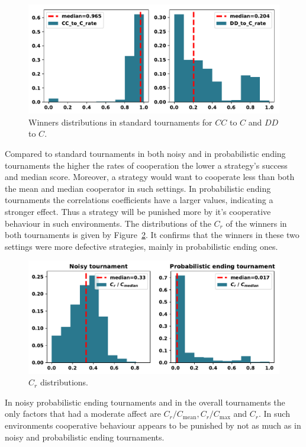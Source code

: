 \documentclass{article}
\begin{document}
\begin{figure}[!htbp]
    \centering
    \includegraphics[width=.7\textwidth]{../images/rates_of_winners_in_standard_tournaments.pdf}
    \caption{Winners distributions
    in standard tournaments for $CC$ to $C$ and $DD$ to $C$.}\label{fig:rates_of_winners_in_standard_tournaments}
\end{figure}

Compared to standard tournaments in both noisy and in probabilistic ending
tournaments the higher the rates of cooperation the lower a strategy's success
and median score. Moreover, a strategy would want to cooperate less than both
the mean and median cooperator in such settings. In probabilistic ending
tournaments the correlations coefficients have a larger values, indicating a
stronger effect. Thus a strategy will be punished more by it's cooperative
behaviour in such environments. The distributions of the $C_r$ of the winners in
both tournaments is given by Figure~\ref{fig:c_r_distributions}. It confirms
that the winners in these two settings were more defective strategies, mainly
in probabilistic ending ones.

\begin{figure}[!htbp]
    \centering
    \includegraphics[width=.7\textwidth]{../images/c_r_winners_tournaments.pdf}
    \caption{$C_r$ distributions.}\label{fig:c_r_distributions}
\end{figure}

In noisy probabilistic ending tournaments and in the overall tournaments the
only factors that had a moderate affect are $C_r/C_{\text{mean}},
C_r/C_{\text{max}}$ and $C_r$. In such environments cooperative behaviour
appears to be punished by not as much as in noisy and probabilistic ending
tournaments.
\end{document}
